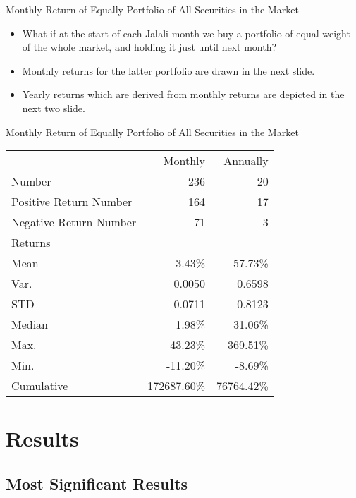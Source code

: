 \documentclass[aspectratio=169]{beamer}
\begin{document}
\begin{frame}{Monthly Return of Equally Portfolio of All Securities in the Market}
	\begin{itemize}
		\item What if at the start of each Jalali month we buy a portfolio of equal weight of the whole market, and holding it just until next month?
		\item Monthly returns for the latter portfolio are drawn in the next slide.
		\item Yearly returns which are derived from monthly returns are depicted in the next two slide.
	\end{itemize}
\end{frame}




\begin{frame}{Monthly Return of Equally Portfolio of All Securities in the Market}
	\begin{center}
		\begin{tabular}{l r r}
			                       & Monthly     & Annually   \\ \cline{2-3}
			Number                 & 236         & 20         \\
			Positive Return Number & 164         & 17         \\
			Negative Return Number & 71          & 3          \\ \hline
			Returns                &             &            \\ \hline
			Mean                   & 3.43\%      & 57.73\%    \\
			Var.                   & 0.0050      & 0.6598     \\
			STD                    & 0.0711      & 0.8123     \\
			Median                 & 1.98\%      & 31.06\%    \\
			Max.                   & 43.23\%     & 369.51\%   \\
			Min.                   & -11.20\%    & -8.69\%    \\
			Cumulative             & 172687.60\% & 76764.42\%
		\end{tabular}
	\end{center}
\end{frame}


\section{Results}
\subsection{Most Significant Results}
\end{document}

